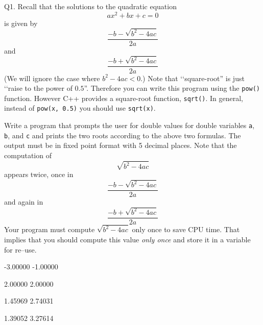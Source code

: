 Q1. Recall that the solutions to the quadratic equation
\[
a x^2 + b x + c = 0
\]
is given by
\[
\frac{-b - \sqrt{b^2 - 4ac}}{2a}
\]
and
\[
\frac{-b + \sqrt{b^2 - 4ac}}{2a}
\]
(We will ignore the case where 
$b^2 - 4ac < 0$.) 
Note that \lq\lq square-root'' is just \lq\lq raise to the power of $0.5$''.
Therefore you can write this program using the 
\verb!pow()! function. However C++ provides a square-root
function, \verb!sqrt()!. 
In general, instead of \verb!pow(x, 0.5)! you should use \verb!sqrt(x)!.

Write a program that prompts the user for double values for double variables 
\verb!a!, \verb!b!, and \verb!c! and prints the
two roots according to the above two formulas. 
The output must be in fixed point format with 5 decimal places. 
Note that the computation of
\[
\sqrt{b^2 - 4ac}
\]
appears twice, once in
\[
\frac{-b - \sqrt{b^2 - 4ac}}{2a}
\]
and again in
\[
\frac{-b + \sqrt{b^2 - 4ac}}{2a}
\]
Your program must compute 
$\sqrt{b^2 - 4ac}$ only once to save CPU time. 
That implies that you should compute this value \textit{only once}
and store it in a variable for re--use.


\resett
\nextt
\begin{console}[commandchars=\\\{\}]
-3.00000 -1.00000
\end{console}

\nextt
\begin{console}[commandchars=\\\{\}]
2.00000 2.00000
\end{console}

\nextt
\begin{console}[commandchars=\\\{\}]
1.45969 2.74031
\end{console}

\nextt
\begin{console}[commandchars=\\\{\}]
1.39052 3.27614
\end{console}

